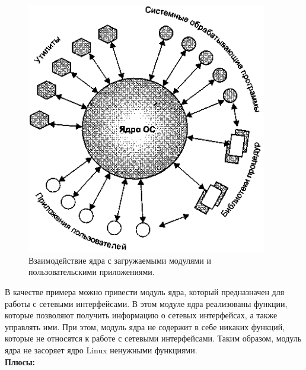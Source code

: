 \begin{figure}[H]
    \centering
    \includegraphics[width=105mm, scale=0.65]{inc/img/lkm}
    \caption{Взаимодействие ядра с загружаемыми модулями и пользовательскими приложениями\cite{lkm-pic}.}
    \label{fig:lkm}
\end{figure}

В качестве примера можно привести модуль ядра, который предназначен для работы с сетевыми интерфейсами.
В этом модуле ядра реализованы функции, которые позволяют получить информацию о сетевых интерфейсах, а также управлять ими.
При этом, модуль ядра не содержит в себе никаких функций, которые не относятся к работе с сетевыми интерфейсами.
Таким образом, модуль ядра не засоряет ядро Linux ненужными функциями.
\vspace{1mm}\\
\textbf{Плюсы:}

